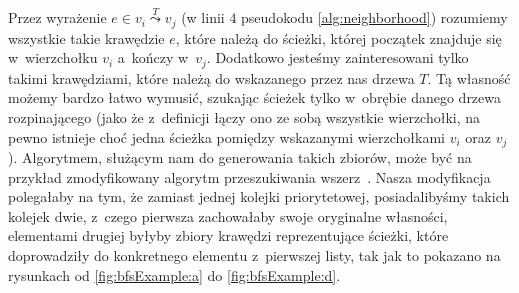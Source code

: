 Przez wyrażenie $e \in v_{i} \overset{T}{\leadsto} v_{j}$ (w linii $4$ pseudokodu \ref{alg:neighborhood}) rozumiemy wszystkie takie krawędzie $e$, które należą do ścieżki, której początek znajduje się w~wierzchołku $v_{i}$ a~kończy w~$v_{j}$. Dodatkowo jesteśmy zainteresowani tylko takimi krawędziami, które należą do wskazanego przez nas drzewa $T$. Tą własność możemy bardzo łatwo wymusić, szukając ścieżek tylko w~obrębie danego drzewa rozpinającego (jako że z~definicji łączy ono ze sobą wszystkie wierzchołki, na pewno istnieje choć jedna ścieżka pomiędzy wskazanymi wierzchołkami $v_{i}$ oraz $v_{j}$). Algorytmem, służącym nam do generowania takich zbiorów, może być na przykład zmodyfikowany algorytm przeszukiwania wszerz~\cite[$604$--$606$]{Cormen}. Nasza modyfikacja polegałaby na tym, że zamiast jednej kolejki priorytetowej, posiadalibyśmy takich kolejek dwie, z~czego pierwsza zachowałaby swoje oryginalne własności, elementami drugiej byłyby zbiory krawędzi reprezentujące ścieżki, które doprowadziły do konkretnego elementu z~pierwszej listy, tak jak to pokazano na rysunkach od \ref{fig:bfsExample:a} do \ref{fig:bfsExample:d}.

